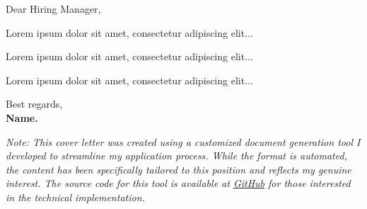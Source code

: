 \documentclass[a4paper,11pt]{letter}
\begin{document}

\normalsize Dear Hiring Manager,

\small \noindent
Lorem ipsum dolor sit amet, consectetur adipiscing elit...

\vspace{1pt}
Lorem ipsum dolor sit amet, consectetur adipiscing elit...

\vspace{1pt}
Lorem ipsum dolor sit amet, consectetur adipiscing elit...

\bigskip
\noindent
Best regards,\\
\textbf{Name.}

\vspace{2cm}
\hrulefill

\begin{small}
\textit{Note: This cover letter was created using a customized document generation tool I developed to streamline my application process. While the format is automated, the content has been specifically tailored to this position and reflects my genuine interest. The source code for this tool is available at \href{https://github.com/DavidRajnoha/resume-generator}{GitHub} for those interested in the technical implementation.}
\end{small}
\end{document}
